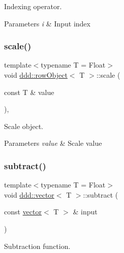 Indexing operator. 


\begin{DoxyParams}{Parameters}
{\em i} & Input index \\
\hline
\end{DoxyParams}
\mbox{\label{classddd_1_1row_object_a6c87f5fadb3b725f6c52cb08aed98eb2}} 
\subsubsection{\texorpdfstring{scale()}{scale()}}
{\footnotesize\ttfamily template$<$typename T  = Float$>$ \\
void \hyperlink{classddd_1_1row_object}{ddd\+::row\+Object}$<$ T $>$\+::scale (\begin{DoxyParamCaption}\item[{const T \&}]{value }\end{DoxyParamCaption})\hspace{0.3cm}{\ttfamily [inline]}, {\ttfamily [inherited]}}



Scale object. 


\begin{DoxyParams}{Parameters}
{\em value} & Scale value \\
\hline
\end{DoxyParams}
\mbox{\label{classddd_1_1vector_abf367c7da55ad2c770a90a3ed3c01d5a}} 
\subsubsection{\texorpdfstring{subtract()}{subtract()}}
{\footnotesize\ttfamily template$<$typename T = Float$>$ \\
void \hyperlink{classddd_1_1vector}{ddd\+::vector}$<$ T $>$\+::subtract (\begin{DoxyParamCaption}\item[{const \hyperlink{classddd_1_1vector}{vector}$<$ T $>$ \&}]{input }\end{DoxyParamCaption})\hspace{0.3cm}{\ttfamily [inline]}}



Subtraction function. 


